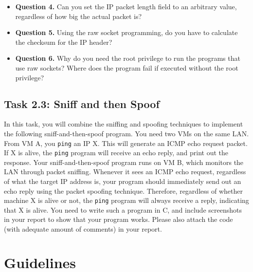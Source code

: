 \begin{itemize}
\item \textbf{Question 4.}
Can you set the IP packet length field to an arbitrary value,
regardless of how big the actual packet is? 


\item \textbf{Question 5.} 
Using the raw socket programming, do you have to calculate the 
checksum for the IP header? 

\item \textbf{Question 6.} 
Why do you need the root privilege to run the programs that 
use raw sockets? Where does the program fail if executed without the root 
privilege?

\end{itemize}
 





\subsection{Task 2.3: Sniff and then Spoof}

In this task, you will combine the sniffing and spoofing techniques
to implement the following sniff-and-then-spoof program. 
You need two VMs on the same LAN. From VM A, you 
{\tt ping} an IP X. This will generate an ICMP echo 
request packet. If X is alive, the {\tt ping} program will receive 
an echo reply, and print out the response. Your sniff-and-then-spoof
program runs on VM B, which monitors the LAN through packet sniffing. Whenever it 
sees an ICMP echo request, regardless of what the target IP address is,
your program should immediately send out an echo reply using the 
packet spoofing technique. Therefore, regardless of whether machine X
is alive or not, the {\tt ping} program will always receive 
a reply, indicating that X is alive. You need to write such a program in C, and
include screenshots in your report to show that 
your program works. Please also attach the code (with adequate amount 
of comments) in your report.







\section{Guidelines} 



